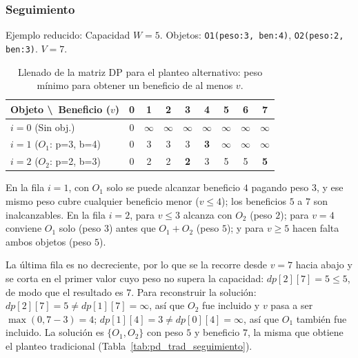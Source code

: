 \documentclass[11pt,a4paper]{article}
\begin{document}
\subsubsection{Seguimiento}
Ejemplo reducido: Capacidad $W = 5$. Objetos: \texttt{O1(peso:3, ben:4)}, \texttt{O2(peso:2, ben:3)}. $V = 7$.
\begin{table}[h!]
    \centering
    \begin{tabular}{@{}lcccccccc@{}}
        \toprule
        \textbf{Objeto \textbackslash \ Beneficio ($v$)} & \textbf{0} & \textbf{1} & \textbf{2} & \textbf{3} & \textbf{4} & \textbf{5} & \textbf{6} & \textbf{7} \\ \midrule
        $i=0$ (Sin obj.) & 0 & $\infty$ & $\infty$ & $\infty$ & $\infty$ & $\infty$ & $\infty$ & $\infty$ \\
        $i=1$ ($O_1$: p=3, b=4) & 0 & 3 & 3 & 3 & \textbf{3} & $\infty$ & $\infty$ & $\infty$ \\
        $i=2$ ($O_2$: p=2, b=3) & 0 & 2 & 2 & \textbf{2} & 3 & 5 & 5 & \textbf{5} \\ \bottomrule
    \end{tabular}
    \caption{Llenado de la matriz DP para el planteo alternativo: peso mínimo para obtener un beneficio de al menos $v$.}
    \label{tab:pd_alt_seguimiento}
\end{table}
En la fila $i=1$, con $O_1$ solo se puede alcanzar beneficio $4$ pagando peso $3$, y ese mismo peso cubre cualquier beneficio menor ($v \le 4$); los beneficios $5$ a $7$ son inalcanzables. En la fila $i=2$, para $v \le 3$ alcanza con $O_2$ (peso $2$); para $v = 4$ conviene $O_1$ solo (peso $3$) antes que $O_1 + O_2$ (peso $5$); y para $v \ge 5$ hacen falta ambos objetos (peso $5$).

La última fila es no decreciente, por lo que se la recorre desde $v = 7$ hacia abajo y se corta en el primer valor cuyo peso no supera la capacidad: $dp[2][7] = 5 \le 5$, de modo que el resultado es $7$. Para reconstruir la solución: $dp[2][7] = 5 \neq dp[1][7] = \infty$, así que $O_2$ fue incluido y $v$ pasa a ser $\max(0, 7 - 3) = 4$; $dp[1][4] = 3 \neq dp[0][4] = \infty$, así que $O_1$ también fue incluido. La solución es $\{O_1, O_2\}$ con peso $5$ y beneficio $7$, la misma que obtiene el planteo tradicional (Tabla~\ref{tab:pd_trad_seguimiento}).
\end{document}
